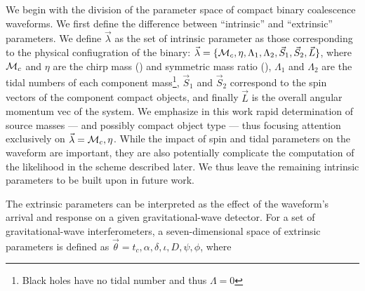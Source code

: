 
We begin with the division of the parameter space of compact binary coalescence waveforms. We first define the difference between ``intrinsic'' and ``extrinsic'' parameters. We define $\vec{\lambda}$ as the set of intrinsic parameter as those corresponding to the physical confiugration of the binary: $\vec{\lambda}=\{{{\cal M}_c},\eta,\Lambda_1,\Lambda_2,\vec{S}_1,\vec{S}_2,\vec{L}\}$, where ${{\cal M}_c}$ and $\eta$ are the chirp mass () and symmetric mass ratio (), $\Lambda_1$ and $\Lambda_2$ are the tidal numbers of each component mass\footnote{Black holes have no tidal number and thus $\Lambda=0$}, $\vec{S}_1$ and $\vec{S}_2$ correspond to the spin vectors of the component compact objects, and finally $\vec{L}$ is the overall angular momentum vec of the system. We emphasize in this work rapid determination of source masses --- and possibly compact object type --- thus focusing attention exclusively on $\vec{\lambda}={{{\cal M}_c},\eta}$. While the impact of spin and tidal parameters on the waveform are important, they are also potentially complicate the computation of the likelihood in the scheme described later. We thus leave the remaining intrinsic parameters to be built upon in future work.

The extrinsic parameters can be interpreted as the effect of the waveform's arrival and response on a given gravitational-wave detector. For a set of gravitational-wave interferometers, a seven-dimensional space of extrinsic parameters is defined as $\vec{\theta}={t_c,\alpha,\delta,\iota,D,\psi,\phi}$, where 
